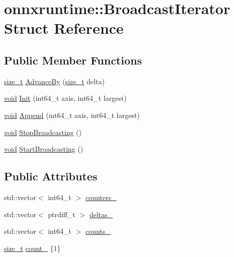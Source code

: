 \hypertarget{structonnxruntime_1_1BroadcastIterator}{}\section{onnxruntime\+:\+:Broadcast\+Iterator Struct Reference}
\label{structonnxruntime_1_1BroadcastIterator}
\subsection*{Public Member Functions}
\begin{DoxyCompactItemize}
\item 
\mbox{\hyperlink{mlasi_8h_a503efbc1c6e50825320ad909366b78ab}{size\+\_\+t}} \mbox{\hyperlink{structonnxruntime_1_1BroadcastIterator_ac27affc89bf45b4a30677565cabad092}{Advance\+By}} (\mbox{\hyperlink{mlasi_8h_a503efbc1c6e50825320ad909366b78ab}{size\+\_\+t}} delta)
\item 
\mbox{\hyperlink{mlasi_8h_a88f941d423cb2a819b70a1358982b1a6}{void}} \mbox{\hyperlink{structonnxruntime_1_1BroadcastIterator_a451a5a3c3520eab5759b86dc2911be7c}{Init}} (int64\+\_\+t axis, int64\+\_\+t largest)
\item 
\mbox{\hyperlink{mlasi_8h_a88f941d423cb2a819b70a1358982b1a6}{void}} \mbox{\hyperlink{structonnxruntime_1_1BroadcastIterator_a6eb31c09b36a0fcf6f0b8263e3a7969b}{Append}} (int64\+\_\+t axis, int64\+\_\+t largest)
\item 
\mbox{\hyperlink{mlasi_8h_a88f941d423cb2a819b70a1358982b1a6}{void}} \mbox{\hyperlink{structonnxruntime_1_1BroadcastIterator_a907eb4592f14f6ed2d49d5ed705e6806}{Stop\+Broadcasting}} ()
\item 
\mbox{\hyperlink{mlasi_8h_a88f941d423cb2a819b70a1358982b1a6}{void}} \mbox{\hyperlink{structonnxruntime_1_1BroadcastIterator_a8b43e1eab529f0133283c97a12ba8d5e}{Start\+Broadcasting}} ()
\end{DoxyCompactItemize}
\subsection*{Public Attributes}
\begin{DoxyCompactItemize}
\item 
std\+::vector$<$ int64\+\_\+t $>$ \mbox{\hyperlink{structonnxruntime_1_1BroadcastIterator_a100ed9262724d025bf350a61d9229476}{counters\+\_\+}}
\item 
std\+::vector$<$ ptrdiff\+\_\+t $>$ \mbox{\hyperlink{structonnxruntime_1_1BroadcastIterator_adf8f2de98dcec6f6dafb1e035a895a75}{deltas\+\_\+}}
\item 
std\+::vector$<$ int64\+\_\+t $>$ \mbox{\hyperlink{structonnxruntime_1_1BroadcastIterator_ad44c54d5dc120bd96e24caeac566356e}{counts\+\_\+}}
\item 
\mbox{\hyperlink{mlasi_8h_a503efbc1c6e50825320ad909366b78ab}{size\+\_\+t}} \mbox{\hyperlink{structonnxruntime_1_1BroadcastIterator_aa3a747ce571eb3a326d1004fb1dbc432}{count\+\_\+}} \{1\}
\end{DoxyCompactItemize}



